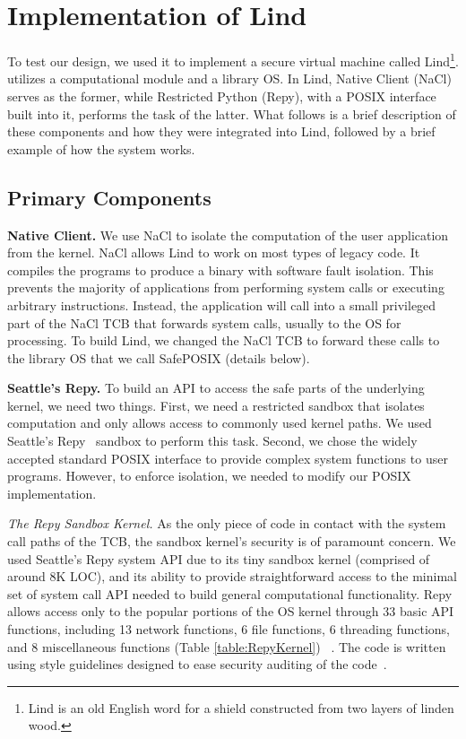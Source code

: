 \section{Implementation of Lind}
\label{sec.implementation}

To test our \lip design, we used it to implement a secure virtual machine
called Lind\footnote{\scriptsize Lind is an old English word for a 
shield constructed from two layers of linden wood.  }.
\lip utilizes a computational module and a library OS. In Lind, Native Client (NaCl) serves as the former,
while Restricted Python (Repy), with a POSIX interface built into it, performs the
task of the latter.
What follows is a brief description of these components and how they were integrated
into Lind, followed by a brief example of how the system works.

\subsection{Primary Components}

\textbf{Native Client.}
We use NaCl to isolate the computation of the user application
from the kernel. NaCl allows Lind to work on most types of legacy code.
It compiles the programs to produce a binary with software fault isolation.
This prevents the majority of applications from performing system calls
or executing arbitrary instructions.
Instead, the application will call into a small privileged
part of the NaCl TCB that forwards system calls, usually to the OS for
processing. To build Lind, we changed the NaCl TCB to
forward these calls to the library OS that we call SafePOSIX (details below).

\textbf{Seattle's Repy.}
To build an API to access the safe parts of the underlying kernel, we need
two things. First, we need a restricted sandbox that isolates computation
and only allows access to commonly used kernel paths.  We used
Seattle's Repy~\cite{Repy-10} sandbox to perform this task.
Second, we chose the widely accepted standard POSIX interface to
provide complex system functions to user programs. However, to enforce isolation,
we needed to modify our POSIX implementation.

\textit{The Repy Sandbox Kernel.}
As the only piece of code in contact with the system call paths of the TCB,
the sandbox kernel's security is of paramount concern.
We used Seattle's Repy system API due to its tiny sandbox kernel
(comprised of around 8K LOC), and its ability to provide straightforward
access to the minimal set of system call API needed to build general
computational functionality. Repy allows
access only to the popular portions of the OS kernel through 33 basic API
functions, including 13 network functions, 6 file functions, 6 threading functions,
and 8 miscellaneous functions (Table \ref{table:RepyKernel}) 
~\cite{Repy-10, RepyKernel}. 
The code is written using style guidelines designed to ease security auditing 
of the code~\cite{style}.

